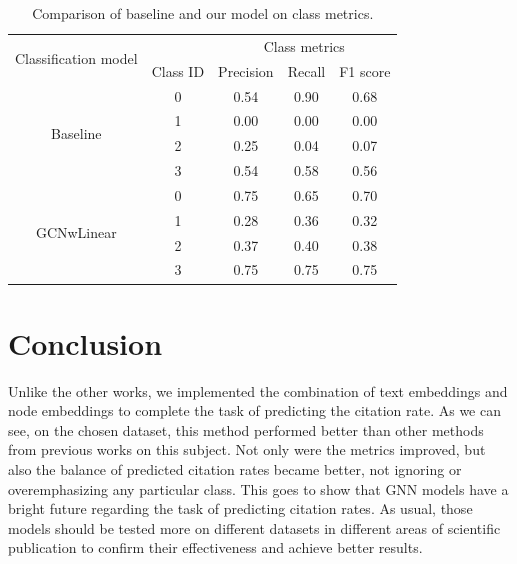 \documentclass{article}
\newcommand\tab[1][1cm]{\hspace*{#1}}
\begin{document}
\begin{table}[h]
\centering
\begin{tabular}{c | c c c c}
\hline\hline

\multirow{2}{*}{Classification model} & & \multicolumn{3}{c}{Class metrics} \\ 
& Class ID & Precision & Recall & F1 score \\
\hline
\multirow{4}{*}{Baseline}
 & 0 & 0.54 & 0.90 & 0.68 \\
 & 1 & 0.00 & 0.00 & 0.00 \\
 & 2 & 0.25 & 0.04 & 0.07 \\
 & 3 & 0.54 & 0.58 & 0.56 \\
\hline
\multirow{4}{*}{GCNwLinear}
 & 0 & 0.75 & 0.65 & 0.70 \\
 & 1 & 0.28 & 0.36 & 0.32 \\
 & 2 & 0.37 & 0.40 & 0.38 \\
 & 3 & 0.75 & 0.75 & 0.75 \\
\end{tabular}
\caption{Comparison of baseline and our model on class metrics.}
\label{table:class_metrics}
\end{table}

\section{Conclusion}
\tab Unlike the other works, we implemented the combination of text embeddings and node embeddings to complete the task of predicting the citation rate. As we can see, on the chosen dataset, this method performed better than other methods from previous works on this subject. Not only were the metrics improved, but also the balance of predicted citation rates became better, not ignoring or overemphasizing any particular class. This goes to show that GNN models have a bright future regarding the task of predicting citation rates.
As usual, those models should be tested more on different datasets in different areas of scientific publication to confirm their effectiveness and achieve better results.

\medskip

\printbibliography[
heading=bibintoc,
title={References}
]
\end{document}
